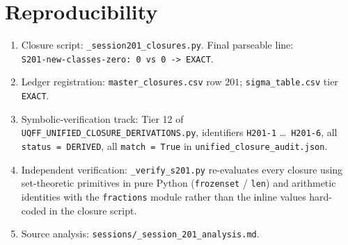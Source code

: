 \documentclass[11pt,letterpaper]{article}
\theoremstyle{definition}
\begin{document}
\section{Reproducibility}

\begin{enumerate}
\item Closure script: \texttt{\_session201\_closures.py}.
      Final parseable line:\\
      \texttt{S201-new-classes-zero: 0 vs 0 -> EXACT}.
\item Ledger registration:
      \texttt{master\_closures.csv} row $201$;
      \texttt{sigma\_table.csv} tier \texttt{EXACT}.
\item Symbolic-verification track: Tier 12 of
      \texttt{UQFF\_UNIFIED\_CLOSURE\_DERIVATIONS.py}, identifiers
      \texttt{H201-1} \ldots\ \texttt{H201-6}, all \texttt{status =
      DERIVED}, all \texttt{match = True} in
      \texttt{unified\_closure\_audit.json}.
\item Independent verification: \texttt{\_verify\_s201.py} re-evaluates
      every closure using set-theoretic primitives in pure Python
      (\texttt{frozenset} / \texttt{len}) and arithmetic identities
      with the \texttt{fractions} module rather than the inline values
      hard-coded in the closure script.
\item Source analysis: \texttt{sessions/\_session\_201\_analysis.md}.
\end{enumerate}
\end{document}
